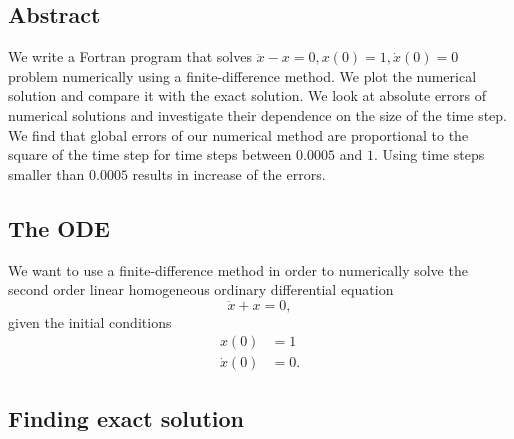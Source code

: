 \subsection{Abstract}

We write a Fortran program that solves $\ddot{x} - x = 0, x(0)=1, \dot{x}(0)=0$ problem numerically using a finite-difference method. We plot the numerical solution and compare it with the exact solution. We look at absolute errors of numerical solutions and investigate their dependence on the size of the time step. We find that global errors of our numerical method are proportional to the square of the time step for time steps between $0.0005$ and $1$. Using time steps smaller than $0.0005$ results in increase of the errors.

\subsection{The ODE}

We want to use a finite-difference method in order to numerically solve the second order linear homogeneous ordinary differential equation
\begin{equation}
  \ddot{x} + x = 0,
  \label{eq_ode}
\end{equation}
given the initial conditions
\begin{align}
  x(0) &= 1 \label{eq_ode_condition_one} \\
  \dot{x}(0) &= 0. \label{eq_ode_condition_two}
\end{align}



\subsection{Finding exact solution}


